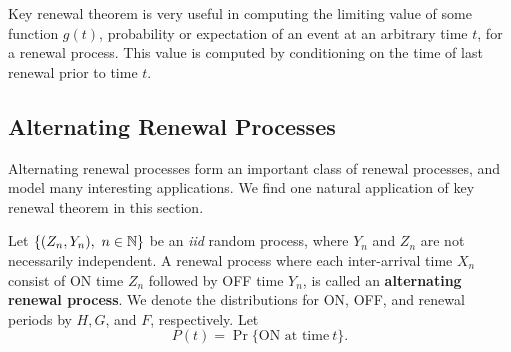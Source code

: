 \documentclass[a4paper,10pt,english]{article}
\begin{document}
Key renewal theorem is very useful in computing the limiting value of some function $g(t)$, probability or expectation of an event at an arbitrary time $t$, for a renewal process. This value is computed by conditioning on the time of last renewal prior to time $t$.

%

\subsection{Alternating Renewal Processes}
Alternating renewal processes form an important class of renewal processes, and model many interesting applications. We find one natural application of  key renewal theorem  in this section. 
\begin{defn} Let $\{(Z_n,Y_n),~n \in \mathbb{N}\}$ be an \emph{iid} random process, where $Y_n$ and $Z_n$ are not necessarily independent. A renewal process where each inter-arrival time $X_n$ consist of ON time $Z_n$ followed by OFF time $Y_n$, is called an \textbf{alternating renewal process}. We denote the distributions for ON, OFF, and renewal periods by $H, G$, and $F$, respectively. Let 
\begin{equation*}
P(t)=\Pr\{\text{ON at time}~ t\}.
\end{equation*}
\end{defn}
\end{document}
